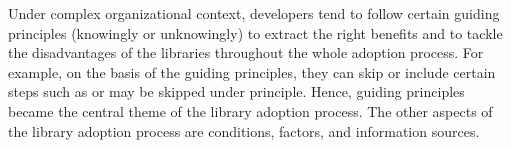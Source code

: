Under complex organizational context, developers tend to follow certain guiding principles (knowingly or unknowingly) to extract the right benefits and to tackle the disadvantages of the libraries throughout the whole adoption process. For example, on the basis of the guiding principles, they can skip or include certain steps such as  or  may be skipped under  principle. 
Hence, guiding principles became the central theme of the library adoption process. The other aspects of the library adoption process are conditions, factors, and information sources.  




